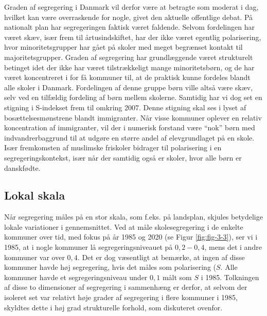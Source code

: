 \documentclass[
]{book}
\begin{document}
Graden af segregering i Danmark vil derfor være at betragte som moderat i dag, hvilket kan være overraskende for nogle, givet den aktuelle offentlige debat. På nationalt plan har segregeringen faktisk været faldende. Selvom fordelingen har været skæv, især frem til årtusindskiftet, har der ikke været egentlig polarisering, hvor minoritetsgrupper har gået på skoler med meget begrænset kontakt til majoritetsgrupper. Graden af segregering har grundlæggende været strukturelt betinget idet der ikke har været tilstrækkeligt mange minoritetsbørn, og de har været koncentreret i for få kommuner til, at de praktisk kunne fordeles blandt alle skoler i Danmark. Fordelingen af denne gruppe børn ville altså være skæv, selv ved en tilfældig fordeling af børn mellem skolerne. Samtidig har vi dog set en stigning i S-indekset frem til omkring 2007. Denne stigning skal ses i lyset af bosættelsesmønstrene blandt immigranter. Når visse kommuner oplever en relativ koncentration af immigranter, vil der i numerisk forstand være ``nok'' børn med indvandrerbaggrund til at udgøre en større andel af elevgrundlaget på en skole. Især fremkomsten af muslimske friskoler bidrager til polarisering i en segregeringskontekst, især når der samtidig også er skoler, hvor alle børn er danskfødte.

\subsection{Lokal skala}\label{lokal-skala}

Når segregering måles på en stor skala, som f.eks. på landsplan, skjules betydelige lokale variationer i gennemsnittet. Ved at måle skolesegregering i de enkelte kommuner over tid, med fokus på år 1985 og 2020 (se Figur \ref{fig:fig-3-3}), ser vi i 1985, at i nogle kommuner lå segregeringsniveauet på \(0,2-0,4\), mens det i andre kommuner var over \(0,4\). Det er dog væsentligt at bemærke, at ingen af disse kommuner havde høj segregering, hvis det måles som polarisering (\(S\). Alle kommuner havde et segregeringsniveau under \(0,1\) målt som \(S\) i 1985. Tolkningen af disse to dimensioner af segregering i sammenhæng er derfor, at selvom der isoleret set var relativt høje grader af segregering i flere kommuner i 1985, skyldtes dette i høj grad strukturelle forhold, som diskuteret ovenfor.
\end{document}

